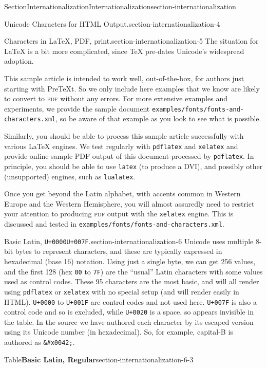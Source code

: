 \documentclass[twoside,10pt,]{article}
\newcommand{\mono}[1]{\texttt{#1}}
\newcommand{\initialism}[1]{\textsc{\MakeLowercase{#1}}}
\numberwithin{equation}{section}
\begin{document}
\begin{sectionptx}{Section}{Internationalization}{}{Internationalization}{}{}{section-internationalization}
\begin{paragraphs}{Unicode Characters for HTML Output.}{section-internationalization-4}
%
\end{paragraphs}%
\begin{paragraphs}{Characters in \LaTeX{}, PDF, print.}{section-internationalization-5}%
The situation for \LaTeX{} is a bit more complicated, since \TeX{} pre-dates Unicode's widespread adoption.%
\par
This sample article is intended to work well, out-of-the-box, for authors just starting with PreTeXt.  So we only include here examples that we know are likely to convert to \initialism{PDF} without any errors.  For more extensive examples and experiments, we provide the sample document \mono{examples/fonts/fonts-and-characters.xml}, so be aware of that example as you look to see what is possible.%
\par
Similarly, you should be able to process this sample article successfully with various \LaTeX{} engines.  We test regularly with \mono{pdflatex} and \mono{xelatex} and provide online sample PDF output of this document processed by \mono{pdflatex}.  In principle, you should be able to use \mono{latex} (to produce a DVI), and possibly other (unsupported) engines, such as \mono{lualatex}.%
\par
Once you get beyond the Latin alphabet, with accents common in Western Europe and the Western Hemisphere, you will almost assuredly need to restrict your attention to producing \initialism{PDF} output with the \mono{xelatex} engine.  This is discussed and tested in \mono{examples/fonts/fonts-and-characters.xml}.%
\end{paragraphs}%
\begin{paragraphs}{Basic Latin, \mono{U+0000}\textendash{}\mono{U+007F}.}{section-internationalization-6}%
Unicode uses multiple 8-bit bytes to represent characters, and these are typically expressed in hexadecimal (base 16) notation.  Using just a single byte, we can get 256 values, and the first 128 (hex \mono{00} to \mono{7F}) are the ``usual'' Latin characters with some values used as control codes.  These 95 characters are the most basic, and will all render using \mono{pdflatex} or \mono{xelatex} with no special setup (and will render easily in HTML).  \mono{U+0000} to \mono{U+001F} are control codes and not used here.  \mono{U+007F} is also a control code and so is excluded, while \mono{U+0020} is a space, so appears invisible in the table.  In the source we have authored each character by its escaped version using its Unicode number (in hexadecimal).  So, for example, capital-B is authored as \mono{\&\#x0042;}.%
\begin{tableptx}{Table}{\textbf{Basic Latin, Regular}}{section-internationalization-6-3}{}%

\end{tableptx}
\end{paragraphs}
\end{sectionptx}
\end{document}
